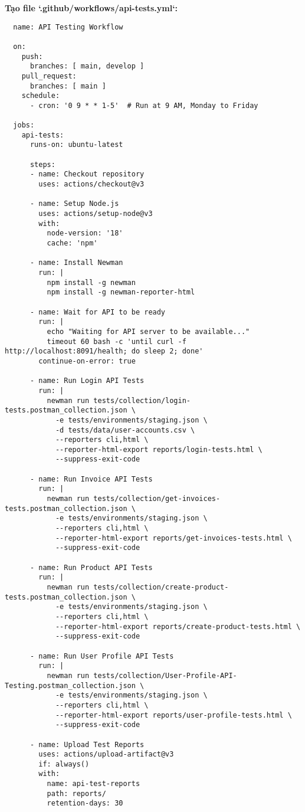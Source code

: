 \documentclass[12pt,a4paper]{article}
\begin{document}
  \textbf{Tạo file `.github/workflows/api-tests.yml`:}
  \begin{lstlisting}
  name: API Testing Workflow

  on:
    push:
      branches: [ main, develop ]
    pull_request:
      branches: [ main ]
    schedule:
      - cron: '0 9 * * 1-5'  # Run at 9 AM, Monday to Friday

  jobs:
    api-tests:
      runs-on: ubuntu-latest
      
      steps:
      - name: Checkout repository
        uses: actions/checkout@v3
        
      - name: Setup Node.js
        uses: actions/setup-node@v3
        with:
          node-version: '18'
          cache: 'npm'
          
      - name: Install Newman
        run: |
          npm install -g newman
          npm install -g newman-reporter-html
          
      - name: Wait for API to be ready
        run: |
          echo "Waiting for API server to be available..."
          timeout 60 bash -c 'until curl -f http://localhost:8091/health; do sleep 2; done'
        continue-on-error: true
        
      - name: Run Login API Tests
        run: |
          newman run tests/collection/login-tests.postman_collection.json \
            -e tests/environments/staging.json \
            -d tests/data/user-accounts.csv \
            --reporters cli,html \
            --reporter-html-export reports/login-tests.html \
            --suppress-exit-code
            
      - name: Run Invoice API Tests
        run: |
          newman run tests/collection/get-invoices-tests.postman_collection.json \
            -e tests/environments/staging.json \
            --reporters cli,html \
            --reporter-html-export reports/get-invoices-tests.html \
            --suppress-exit-code
            
      - name: Run Product API Tests
        run: |
          newman run tests/collection/create-product-tests.postman_collection.json \
            -e tests/environments/staging.json \
            --reporters cli,html \
            --reporter-html-export reports/create-product-tests.html \
            --suppress-exit-code
            
      - name: Run User Profile API Tests
        run: |
          newman run tests/collection/User-Profile-API-Testing.postman_collection.json \
            -e tests/environments/staging.json \
            --reporters cli,html \
            --reporter-html-export reports/user-profile-tests.html \
            --suppress-exit-code
            
      - name: Upload Test Reports
        uses: actions/upload-artifact@v3
        if: always()
        with:
          name: api-test-reports
          path: reports/
          retention-days: 30
  \end{lstlisting}
\end{document}
